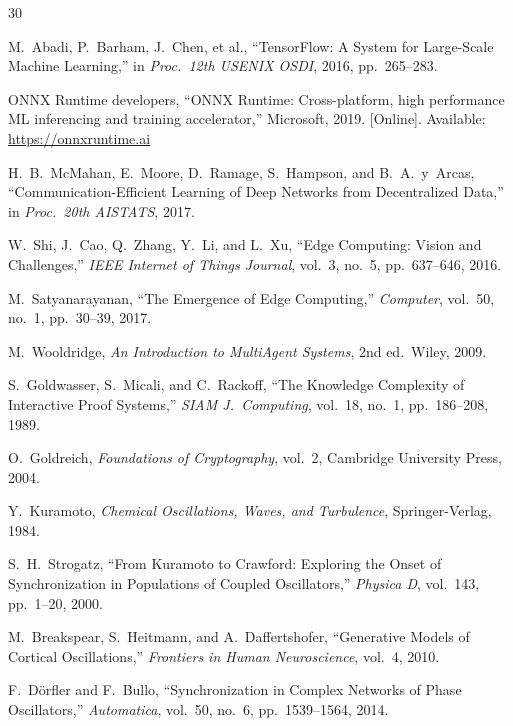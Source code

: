 \documentclass[12pt]{article}
\begin{document}
\begin{thebibliography}{30}

M.~Abadi, P.~Barham, J.~Chen, et al., ``TensorFlow: A System for Large-Scale Machine Learning,'' in \emph{Proc.\ 12th USENIX OSDI}, 2016, pp.~265--283.

ONNX Runtime developers, ``ONNX Runtime: Cross-platform, high performance ML inferencing and training accelerator,'' Microsoft, 2019. [Online]. Available: \url{https://onnxruntime.ai}

H.~B.~McMahan, E.~Moore, D.~Ramage, S.~Hampson, and B.~A.~y~Arcas, ``Communication-Efficient Learning of Deep Networks from Decentralized Data,'' in \emph{Proc.\ 20th AISTATS}, 2017.

W.~Shi, J.~Cao, Q.~Zhang, Y.~Li, and L.~Xu, ``Edge Computing: Vision and Challenges,'' \emph{IEEE Internet of Things Journal}, vol.~3, no.~5, pp.~637--646, 2016.

M.~Satyanarayanan, ``The Emergence of Edge Computing,'' \emph{Computer}, vol.~50, no.~1, pp.~30--39, 2017.

M.~Wooldridge, \emph{An Introduction to MultiAgent Systems}, 2nd ed.\ Wiley, 2009.

S.~Goldwasser, S.~Micali, and C.~Rackoff, ``The Knowledge Complexity of Interactive Proof Systems,'' \emph{SIAM J.\ Computing}, vol.~18, no.~1, pp.~186--208, 1989.

O.~Goldreich, \emph{Foundations of Cryptography}, vol.~2, Cambridge University Press, 2004.

Y.~Kuramoto, \emph{Chemical Oscillations, Waves, and Turbulence}, Springer-Verlag, 1984.

S.~H.~Strogatz, ``From Kuramoto to Crawford: Exploring the Onset of Synchronization in Populations of Coupled Oscillators,'' \emph{Physica D}, vol.~143, pp.~1--20, 2000.

M.~Breakspear, S.~Heitmann, and A.~Daffertshofer, ``Generative Models of Cortical Oscillations,'' \emph{Frontiers in Human Neuroscience}, vol.~4, 2010.

F.~D\"orfler and F.~Bullo, ``Synchronization in Complex Networks of Phase Oscillators,'' \emph{Automatica}, vol.~50, no.~6, pp.~1539--1564, 2014.


\end{thebibliography}
\end{document}

